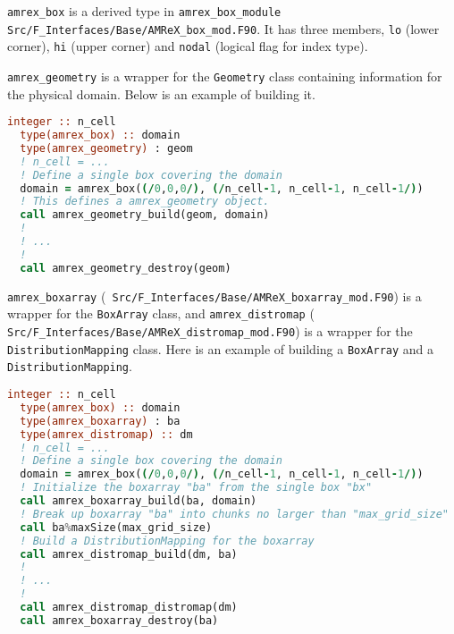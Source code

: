 {{\tt amrex\_box} is a derived type in {\tt amrex\_box\_module} {\tt
  Src/F\_Interfaces/Base/AMReX\_box\_mod.F90}.  It has three members,
{\tt lo} (lower corner), {\tt hi} (upper corner) and {\tt nodal}
(logical flag for index type).  

{\tt amrex\_geometry} is a wrapper for the {\tt Geometry} class
containing information for the physical domain.  Below is an example
of building it.
\begin{lstlisting}[language=fortran]
  integer :: n_cell
  type(amrex_box) :: domain
  type(amrex_geometry) : geom
  ! n_cell = ...
  ! Define a single box covering the domain
  domain = amrex_box((/0,0,0/), (/n_cell-1, n_cell-1, n_cell-1/))
  ! This defines a amrex_geometry object.
  call amrex_geometry_build(geom, domain)
  !
  ! ...
  !
  call amrex_geometry_destroy(geom)
\end{lstlisting}


{\tt amrex\_boxarray} ({\tt
  Src/F\_Interfaces/Base/AMReX\_boxarray\_mod.F90}) is a wrapper for
the {\tt BoxArray} class, and {\tt amrex\_distromap} ({\tt
  Src/F\_Interfaces/Base/AMReX\_distromap\_mod.F90}) is a wrapper for
the {\tt DistributionMapping} class.  Here is an example of
building a {\tt BoxArray} and a {\tt DistributionMapping}.
\begin{lstlisting}[language=fortran]
  integer :: n_cell
  type(amrex_box) :: domain
  type(amrex_boxarray) : ba
  type(amrex_distromap) :: dm
  ! n_cell = ...
  ! Define a single box covering the domain
  domain = amrex_box((/0,0,0/), (/n_cell-1, n_cell-1, n_cell-1/))
  ! Initialize the boxarray "ba" from the single box "bx"
  call amrex_boxarray_build(ba, domain)
  ! Break up boxarray "ba" into chunks no larger than "max_grid_size"
  call ba%maxSize(max_grid_size)
  ! Build a DistributionMapping for the boxarray
  call amrex_distromap_build(dm, ba)
  !
  ! ...
  !
  call amrex_distromap_distromap(dm)
  call amrex_boxarray_destroy(ba)
\end{lstlisting}

}
